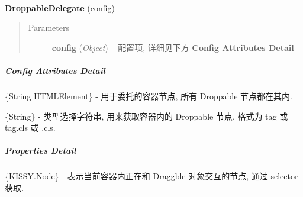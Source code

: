 \documentclass[letterpaper,10pt,english]{sphinxmanual}
\begin{document}
\begin{fulllineitems}
\label{api/component/dd/droppable-delegate:DroppableDelegate.DroppableDelegate}~
\begin{DUlineblock}{0em}
\item[] \textbf{DroppableDelegate} (config)
\end{DUlineblock}
\begin{quote}\begin{description}
\item[{Parameters}] \leavevmode
\textbf{config} (\emph{Object}) -- 配置项, 详细见下方 \textbf{Config Attributes Detail}

\end{description}\end{quote}

\end{fulllineitems}



\subparagraph{Config Attributes Detail}
\label{api/component/dd/droppable-delegate:config-attributes-detail}

\begin{fulllineitems}
\label{api/component/dd/droppable-delegate:DroppableDelegate.container}
\{String \textbar{} HTMLElement\} - 用于委托的容器节点, 所有 Droppable 节点都在其内.

\end{fulllineitems}



\begin{fulllineitems}
\label{api/component/dd/droppable-delegate:DroppableDelegate.selector}
\{String\} - 类型选择字符串, 用来获取容器内的 Droppable 节点, 格式为 tag 或 tag.cls 或 .cls.

\end{fulllineitems}



\subparagraph{Properties Detail}
\label{api/component/dd/droppable-delegate:properties-detail}

\begin{fulllineitems}
\label{api/component/dd/droppable-delegate:DroppableDelegate.node}
\{KISSY.Node\} - 表示当前容器内正在和 Draggble 对象交互的节点,  通过 selector 获取.

\end{fulllineitems}
\end{document}
